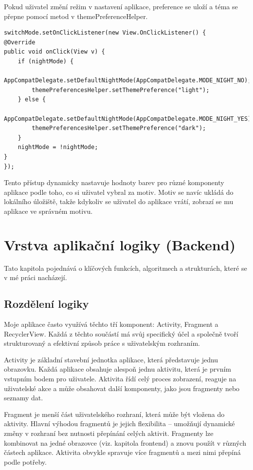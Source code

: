 Pokud uživatel změní režim v nastavení aplikace, preference se uloží a téma se přepne pomocí metod v themePreferenceHelper.
\begin{lstlisting}[style=javastyle,caption = {Změnění motivu},label = {lst:nastaveníMotivu}]
switchMode.setOnClickListener(new View.OnClickListener() {
@Override
public void onClick(View v) {
    if (nightMode) {
        AppCompatDelegate.setDefaultNightMode(AppCompatDelegate.MODE_NIGHT_NO);
        themePreferencesHelper.setThemePreference("light");
    } else {
        AppCompatDelegate.setDefaultNightMode(AppCompatDelegate.MODE_NIGHT_YES);
        themePreferencesHelper.setThemePreference("dark");
    }
    nightMode = !nightMode;
}
});
\end{lstlisting}

Tento přístup dynamicky nastavuje hodnoty barev pro různé komponenty aplikace podle toho, co si uživatel vybral za motiv. Motiv se navíc ukládá do lokálního úložiště, takže kdykoliv se uživatel do aplikace vrátí, zobrazí se mu aplikace ve správném motivu.
\newpage
\section{Vrstva aplikační logiky (Backend)}
\hspace{14pt} Tato kapitola pojednává o klíčových funkcích, algoritmech a strukturách, které se v mé práci nacházejí.
\subsection{Rozdělení logiky}
\hspace{14pt} Moje aplikace často využívá těchto tří komponent: Activity, Fragment a RecyclerView. Každá z těchto součástí má svůj specifický účel a společně tvoří strukturovaný a efektivní způsob práce s uživatelským rozhraním.  

Activity je základní stavební jednotka aplikace, která představuje jednu obrazovku. Každá aplikace obsahuje alespoň jednu aktivitu, která je prvním vstupním bodem pro uživatele. Aktivita řídí celý proces zobrazení, reaguje na uživatelské akce a může obsahovat další komponenty, jako jsou fragmenty nebo seznamy dat.  

Fragment je menší část uživatelského rozhraní, která může být vložena do aktivity. Hlavní výhodou fragmentů je jejich flexibilita – umožňují dynamické změny v rozhraní bez nutnosti přepínání celých aktivit. Fragmenty lze kombinovat na jedné obrazovce (viz. kapitola frontend) a znovu použít v různých částech aplikace. Aktivita obvykle spravuje více fragmentů a mezi nimi přepíná podle potřeby.  


